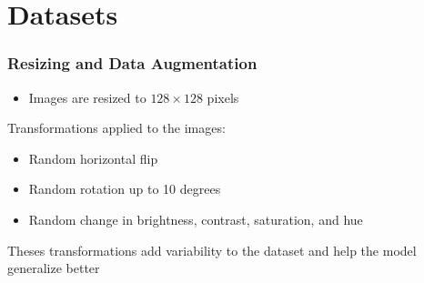 \documentclass[../presentation.tex]{subfiles} %
\begin{document}
\section{Datasets}

\begin{frame}

    \frametitle{Resizing and Data Augmentation}

    \begin{cbox}[cyan]
        \begin{itemize}
            \item Images are resized to $128 \times 128$ pixels
        \end{itemize}
    \end{cbox}

    \vspace{0.2cm}

    \begin{cbox}
        Transformations applied to the images:
        \begin{itemize}
            \item Random horizontal flip
            \item Random rotation up to 10 degrees
            \item Random change in brightness, contrast, saturation, and hue
        \end{itemize}

        \vspace{0.2cm}

        Theses transformations add variability to the dataset and help the model generalize better
    \end{cbox}

\end{frame}
\end{document}
